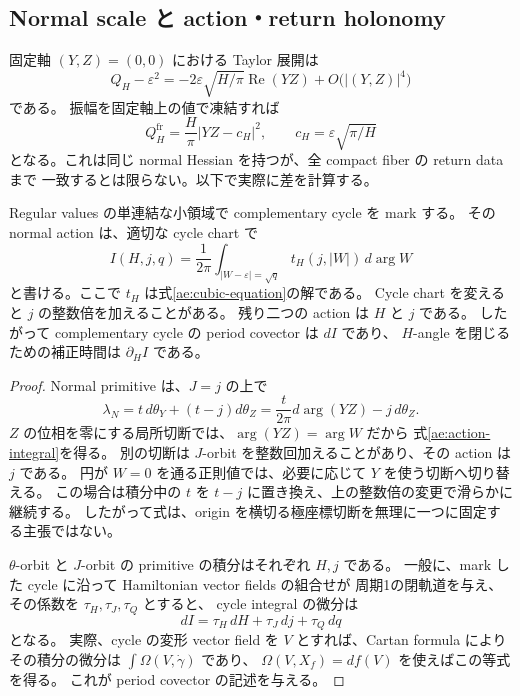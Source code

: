 \subsection{Normal scale と action・return holonomy}

固定軸 $(Y,Z)=(0,0)$ における Taylor 展開は
\begin{equation}\label{ae:hessian}
 Q_H-\varepsilon^2
 =-2\varepsilon\sqrt{H/\pi}\operatorname{Re}(YZ)
 +O\bigl(|(Y,Z)|^4\bigr)
\end{equation}
である。
振幅を固定軸上の値で凍結すれば
\begin{equation}\label{ae:frozen}
 Q_H^{\mathrm{fr}}=\frac H\pi|YZ-c_H|^2,
 \qquad c_H=\varepsilon\sqrt{\pi/H}
\end{equation}
となる。これは同じ normal Hessian を持つが、全 compact fiber の return data まで
一致するとは限らない。以下で実際に差を計算する。

\begin{proposition}\label{ae:action}
Regular values の単連結な小領域で complementary cycle を mark する。
その normal action は、適切な cycle chart で
\begin{equation}\label{ae:action-integral}
 I(H,j,q)=\frac1{2\pi}
 \int_{|W-\varepsilon|=\sqrt q}
 t_H(j,|W|)\,d\arg W
\end{equation}
と書ける。ここで $t_H$ は式\eqref{ae:cubic-equation}の解である。
Cycle chart を変えると $j$ の整数倍を加えることがある。
残り二つの action は $H$ と $j$ である。
したがって complementary cycle の period covector は $dI$ であり、
$H$-angle を閉じるための補正時間は $\partial_H I$ である。
\end{proposition}

\begin{proof}
Normal primitive は、$J=j$ の上で
\[
 \lambda_N=t\,d\theta_Y+(t-j)d\theta_Z
 =\frac{t}{2\pi}d\arg(YZ)-j\,d\theta_Z.
\]
$Z$ の位相を零にする局所切断では、$\arg(YZ)=\arg W$ だから
式\eqref{ae:action-integral}を得る。
別の切断は $J$-orbit を整数回加えることがあり、その action は $j$ である。
円が $W=0$ を通る正則値では、必要に応じて $Y$ を使う切断へ切り替える。
この場合は積分中の $t$ を $t-j$ に置き換え、上の整数倍の変更で滑らかに継続する。
したがって式は、origin を横切る極座標切断を無理に一つに固定する主張ではない。

$\theta$-orbit と $J$-orbit の primitive の積分はそれぞれ $H,j$ である。
一般に、mark した cycle に沿って Hamiltonian vector fields の組合せが
周期1の閉軌道を与え、その係数を $\tau_H,\tau_J,\tau_Q$ とすると、
cycle integral の微分は
\[
 dI=\tau_H\,dH+\tau_J\,dj+\tau_Q\,dq
\]
となる。
実際、cycle の変形 vector field を $V$ とすれば、Cartan formula により
その積分の微分は $\int\Omega(V,\dot\gamma)$ であり、
$\Omega(V,X_f)=df(V)$ を使えばこの等式を得る。
これが period covector の記述を与える。
\end{proof}

